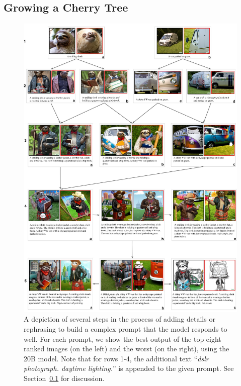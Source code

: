 \subsection{Growing a Cherry Tree}\label{secs:growing_cherry_tree}
\begin{figure}
\centering
\begin{adjustwidth}{-0.8in}{-0.9in}
\centering
    \vspace{-1cm}
    \includegraphics[scale=0.25]{figures/growing_cherry_tree.jpg}
\end{adjustwidth}
\caption{A depiction of several steps in the process of adding details or rephrasing to build a complex prompt that the model responds to well. For each prompt, we show the best output of the top eight ranked images (on the left) and the worst (on the right), using the 20B \bdraw model. Note that for rows 1-4, the additional text ``\textit{dslr photograph. daytime lighting.}'' is appended to the given prompt. See Section~\ref{secs:growing_cherry_tree} for discussion.}
\label{figs:cherry_tree}
\end{figure}

